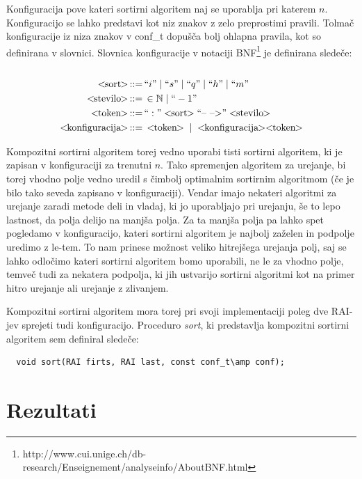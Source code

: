 \documentclass[a4paper,oneside]{article}
\def\N{\mathbb N}
\def\ali{\;|\;}
\newenvironment{BNF}{
    \\
    \Sbox
    \minipage{12cm}
}{
    \endminipage
    \endSbox
    \minipage{\textwidth}
    \vspace*{5pt}
    \begin{center}
        \fcolorbox{white}{white}{
            \TheSbox
        }
    \end{center}
    \vspace*{5pt}
    \endminipage
}
\def\&:{\,::=&\,}
\newcommand{\q}[1]{\text{``}#1\text{''}}
\newcommand{\ntm}[1]{\ensuremath{<\!\!\text{#1}\!\!>}}
\newcommand{\abnf}[2]{\ensuremath{\ntm{#1} \&: #2}}
\begin{document}
Konfiguracija pove kateri sortirni algoritem naj se uporablja pri
katerem $n$. Konfiguracijo se lahko predstavi kot niz znakov z zelo preprostimi
pravili. Tolmač konfiguracije iz niza znakov v conf\_t dopušča bolj ohlapna pravila, kot so
definirana v slovnici. Slovnica konfiguracije v notaciji
BNF\footnote{http://www.cui.unige.ch/db-research/Enseignement/analyseinfo/AboutBNF.html}
je definirana sledeče:
\\
\begin{BNF} %
  \begin{align*}
    \abnf{sort}{\q{i} \ali \q{s} \ali \q{q} \ali \q{h} \ali \q{m}}\\ %
    \abnf{stevilo}{\in \N \ali \q{-1}} \\
    \abnf{token}{\q{:}\ntm{sort}\q{\mbox{--}~\mbox{--}\mbox{$>$}}\ntm{stevilo}}\\
    \abnf{konfiguracija}{\ntm{token} \ali \ntm{konfiguracija}\ntm{token}}
  \end{align*}
\end{BNF}

Kompozitni sortirni algoritem torej vedno uporabi tisti sortirni algoritem, ki je zapisan
v konfiguraciji za trenutni $n$. Tako spremenjen algoritem za urejanje, bi torej vhodno
polje vedno uredil s čimbolj optimalnim sortirnim algoritmom (če je bilo tako seveda
zapisano v konfiguraciji). Vendar imajo nekateri algoritmi za urejanje zaradi metode deli in vladaj,
ki jo uporabljajo pri urejanju, še to lepo lastnost, da polja delijo na manjša polja. Za
ta manjša polja pa lahko spet pogledamo v konfiguracijo, kateri sortirni algoritem je
najbolj zaželen in podpolje uredimo z le-tem. To nam prinese možnost veliko hitrejšega
urejanja polj, saj se lahko odločimo kateri sortirni algoritem bomo
uporabili, ne le za vhodno polje, temveč tudi za nekatera podpolja, ki jih ustvarijo
sortirni algoritmi kot na primer hitro urejanje ali urejanje z zlivanjem.

Kompozitni sortirni algoritem mora torej pri svoji implementaciji poleg dve RAI-jev
sprejeti tudi konfiguracijo. Proceduro \emph{sort}, ki predstavlja kompozitni sortirni
algoritem sem definiral sledeče: 
\begin{lstlisting}
  void sort(RAI firts, RAI last, const conf_t\amp conf);
\end{lstlisting}

%


\section{Rezultati}
\end{document}
